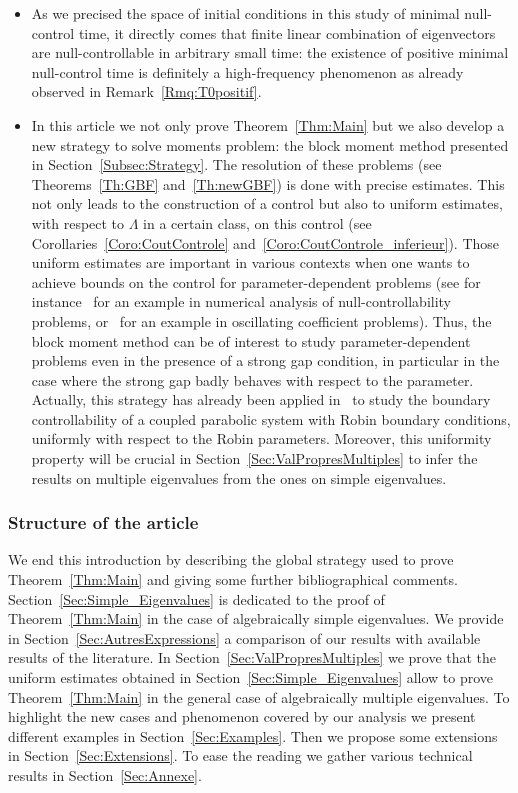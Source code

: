\documentclass[AHL,Unicode,longabstracts]{cedram}
\begin{document}
\begin{itemize}
\item As we precised the space of initial conditions in this study of minimal null-control time, it directly comes that finite linear combination of eigenvectors are null-controllable in arbitrary small time: the existence of positive minimal null-control time is definitely a high-frequency phenomenon as already observed in Remark~\ref{Rmq:T0positif}.

\item In this article we not only prove Theorem~\ref{Thm:Main} but we also develop a new strategy to solve moments problem: the block moment method presented in Section~\ref{Subsec:Strategy}. The resolution of these problems (see Theorems~\ref{Th:GBF} and~\ref{Th:newGBF}) is done with precise estimates. This not only leads to the construction of a control but also to uniform estimates, with respect to $\Lambda$ in a certain class, on this control (see Corollaries~\ref{Coro:CoutControle} and~\ref{Coro:CoutControle_inferieur}). Those uniform estimates are important in various contexts when one wants to achieve bounds on the control for parameter-dependent problems (see for instance~\cite{AB18,ABM_2018} for an example in numerical analysis of null-controllability problems, or~\cite{LopezZuazua:2002} for an example in oscillating coefficient problems). Thus, the block moment method can be of interest to study parameter-dependent problems even in the presence of a strong gap condition, in particular in the case where the strong gap badly behaves with respect to the parameter. Actually, this strategy has already been applied in~\cite{BoyerBhandari:2019} to study the boundary controllability of a coupled parabolic system with Robin boundary conditions, uniformly with respect to the Robin parameters. Moreover, this uniformity property will be crucial in Section~\ref{Sec:ValPropresMultiples} to infer the results on multiple eigenvalues from the ones on simple eigenvalues.
\end{itemize}



\subsubsection{Structure of the article}

We end this introduction by describing the global strategy used to prove Theorem~\ref{Thm:Main} and giving some further bibliographical comments. Section~\ref{Sec:Simple_Eigenvalues} is dedicated to the proof of Theorem~\ref{Thm:Main} in the case of algebraically simple eigenvalues. We provide in Section~\ref{Sec:AutresExpressions} a comparison of our results with available results of the literature. In Section~\ref{Sec:ValPropresMultiples} we prove that the uniform estimates obtained in Section~\ref{Sec:Simple_Eigenvalues} allow to prove Theorem~\ref{Thm:Main} in the general case of algebraically multiple eigenvalues. To highlight the new cases and phenomenon covered by our analysis we present different examples in Section~\ref{Sec:Examples}. Then we propose some extensions in Section~\ref{Sec:Extensions}. To ease the reading we gather various technical results in Section~\ref{Sec:Annexe}.
\end{document}
